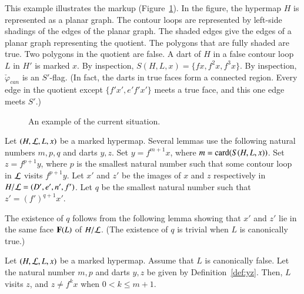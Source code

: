 \begin{example}[illustration]\label{ex:graph-gen}  
  This example illustrates the markup (Figure~\ref{fig:graph-gen}).
  In the figure, the hypermap $H$ is represented as a planar graph.
  The contour loops are represented by left-side shadings of the edges
  of the planar graph.  The shaded edges give the edges of a planar
  graph representing the quotient.  The polygons that are fully shaded
  are true.  Two polygons in the quotient are false.  A dart of $H$ in
  a false contour loop $L$ in $H'$ is marked $x$.  By inspection,
  $S(H,L,x)=\{f x,f^2 x,f^3 x\}$.  By inspection,
  $\check\varphi_{can}$ is an $S'$-flag.  (In fact, the darts in true
  faces form a connected region.  Every edge in the quotient except
  $\{f' x', e' f' x'\}$ meets a true face, and this one edge meets
  $S'$.)
\end{example}

\begin{figure}[htb]
\centering
{}
\caption{An example of the current situation.}
\label{fig:graph-gen}
\end{figure}

\begin{definition}[$m$,$p$,$q$,$y$,$z$]\label{def:yz}
Let $(H,{\cal L},L,x)$ be a marked hypermap.
Several lemmas use the following natural numbers $m,p,q$ and darts $y,z$.
Set  $y = f^{m+1} x$, where $m = {\operatorname{card}}(S(H,L,x))$.
  Set
$z=f^{p+1} y$, where $p$ is the smallest natural number 
such that some contour loop in ${\cal L}$ visits $f^{p+1} y$.
Let $x'$ and $z'$ be the images of $x$ and $z$ respectively in $H/{\cal L} = (D',e',n',f')$.
Let $q$ be the smallest natural number such that $z' = (f')^{q+1} x'$.  
\end{definition}

The existence of $q$ follows from the following lemma showing that $x'$ and $z'$
lie in the same face ${\mathbf F}(L)$ of $H/{\cal L}$.  (The existence of $q$ is trivial
when $L$ is canonically true.)

\begin{lemma} \label{lemma:yz}
Let $(H,{\cal L},L,x)$ be a marked hypermap.
Assume that  $L$ is canonically false. %
Let the natural number $m,p$ and darts $y,z$ be given by Definition~\ref{def:yz}.
Then, $L$ visits $z$, and $z\ne f^k x$ when $0 < k \le {m+1}$.
\end{lemma}

